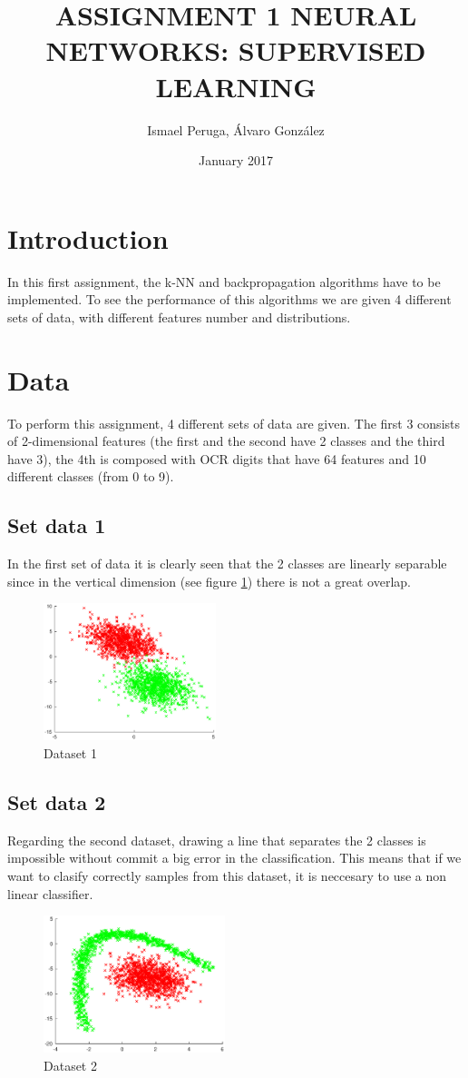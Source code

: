 \documentclass{article}
\title{ASSIGNMENT 1 NEURAL NETWORKS: SUPERVISED LEARNING}
\author{Ismael Peruga, Álvaro González}
\date{January 2017}
\begin{document}
\maketitle
\section{Introduction}
In this first assignment, the k-NN and backpropagation algorithms have to be implemented. To see the performance of this algorithms we are given 4 different sets of data, with different features number and distributions.

\section{Data}
To perform this assignment, 4 different sets of data are given. The first 3 consists of 2-dimensional features (the first and the second have 2 classes and the third have 3), the 4th is composed with OCR digits that have 64 features and 10 different classes (from 0 to 9).

\subsection{Set data 1}
In the first set of data it is clearly seen that the 2 classes are linearly separable since in the vertical dimension (see figure \ref{fig:dataset1}) there is not a great overlap.
\begin{figure}[!htb]
\centering
\includegraphics[height=4cm]{images/dataset1}
\caption{Dataset 1}
\label{fig:dataset1}
\end{figure}

\subsection{Set data 2}
Regarding the second dataset, drawing a line that separates the 2 classes is impossible without commit a big error in the classification. This means that if we want to clasify correctly samples from this dataset, it is neccesary to use a non linear classifier. 
\begin{figure}[!htb]
\centering
\includegraphics[height=4cm]{images/dataset2}
\caption{Dataset 2}
\label{fig:dataset2}
\end{figure}
\end{document}
